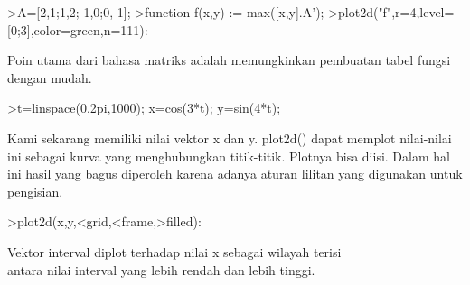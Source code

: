 \documentclass{article}
\begin{document}
\begin{eulernotebook}
\begin{eulercomment}
\begin{eulercomment}
\begin{eulercomment}
\begin{eulercomment}
\begin{eulerprompt}
>A=[2,1;1,2;-1,0;0,-1];
>function f(x,y) := max([x,y].A');
>plot2d("f",r=4,level=[0;3],color=green,n=111):
\end{eulerprompt}
\begin{eulercomment}
Poin utama dari bahasa matriks adalah memungkinkan pembuatan tabel
fungsi dengan mudah.
\end{eulercomment}
\begin{eulerprompt}
>t=linspace(0,2pi,1000); x=cos(3*t); y=sin(4*t);
\end{eulerprompt}
\begin{eulercomment}
Kami sekarang memiliki nilai vektor x dan y. plot2d() dapat memplot
nilai-nilai ini sebagai kurva yang menghubungkan titik-titik. Plotnya
bisa diisi. Dalam hal ini hasil yang bagus diperoleh karena adanya
aturan lilitan yang digunakan untuk pengisian.
\end{eulercomment}
\begin{eulerprompt}
>plot2d(x,y,<grid,<frame,>filled):
\end{eulerprompt}
\begin{eulercomment}
Vektor interval diplot terhadap nilai x sebagai wilayah terisi\\
antara nilai interval yang lebih rendah dan lebih tinggi.


\end{eulercomment}
\end{eulercomment}
\end{eulercomment}
\end{eulercomment}
\end{eulercomment}
\end{eulernotebook}
\end{document}

